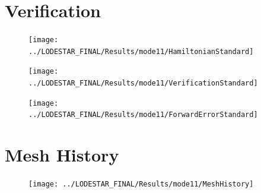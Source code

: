 		
		\section{Verification}
		\begin{figure}
			\centering
			\texttt{[image: ../LODESTAR\_FINAL/Results/mode11/HamiltonianStandard]}
			\caption{}
			\label{fig:HamiltonianStandard}
		\end{figure}
		
		\begin{figure}
			\centering
			\texttt{[image: ../LODESTAR\_FINAL/Results/mode11/VerificationStandard]}
			\caption{}
			\label{fig:VerificationStandard}
		\end{figure}
		
		\begin{figure}
			\centering
			\texttt{[image: ../LODESTAR\_FINAL/Results/mode11/ForwardErrorStandard]}
			\caption{}
			\label{fig:ForwardErrorStandard}
		\end{figure}
		
		\section{Mesh History}
		
		
\begin{figure}[th]
\centering
\texttt{[image: ../LODESTAR\_FINAL/Results/mode11/MeshHistory]}
\caption{}
\label{fig:MeshHistory}
\end{figure}
		
